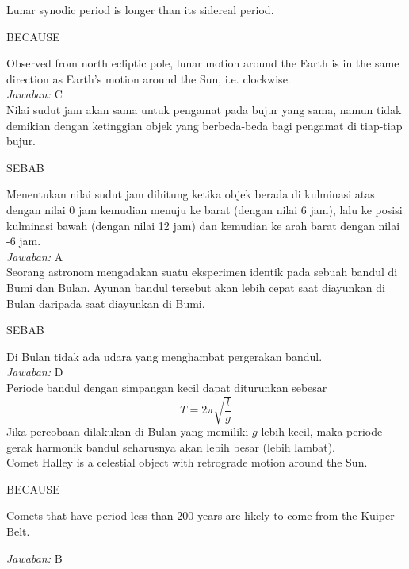 \documentclass[11pt,fleqn]{exam}
\begin{document}
\begin{questions}
\question Lunar synodic period is longer than its sidereal period.
\begin{center}
BECAUSE
\end{center}
Observed from north ecliptic pole, lunar motion around the Earth is in the same direction as Earth's motion around the Sun, i.e. clockwise.\\

\textit{Jawaban: } C\\



\question Nilai sudut jam akan sama untuk pengamat pada bujur yang sama, namun tidak demikian dengan ketinggian objek yang berbeda-beda bagi pengamat di tiap-tiap bujur.
\begin{center}
SEBAB
\end{center}
Menentukan nilai sudut jam dihitung ketika objek berada di kulminasi atas dengan nilai 0 jam kemudian menuju ke barat (dengan nilai 6 jam), lalu ke posisi kulminasi bawah (dengan nilai 12 jam) dan kemudian ke arah barat dengan nilai -6 jam.\\

\textit{Jawaban: } A\\


\question Seorang astronom mengadakan suatu eksperimen identik pada sebuah bandul di Bumi dan Bulan. Ayunan bandul tersebut akan lebih cepat saat diayunkan di Bulan daripada saat diayunkan di Bumi.
\begin{center}
SEBAB
\end{center}
Di Bulan tidak ada udara yang menghambat pergerakan bandul.\\

\textit{Jawaban: } D\\

Periode bandul dengan simpangan kecil dapat diturunkan sebesar
\begin{equation*}
T = 2 \pi \sqrt{\frac{l}{g}}
\end{equation*}
Jika percobaan dilakukan di Bulan yang memiliki $g$ lebih kecil, maka periode gerak harmonik bandul seharusnya akan lebih besar (lebih lambat).\\


\question Comet Halley is a celestial object with retrograde motion around the Sun.
\begin{center}
BECAUSE
\end{center}
Comets that have period less than 200 years are likely to come from the Kuiper Belt.

\textit{Jawaban: } B\\


\end{questions}
\end{document}
